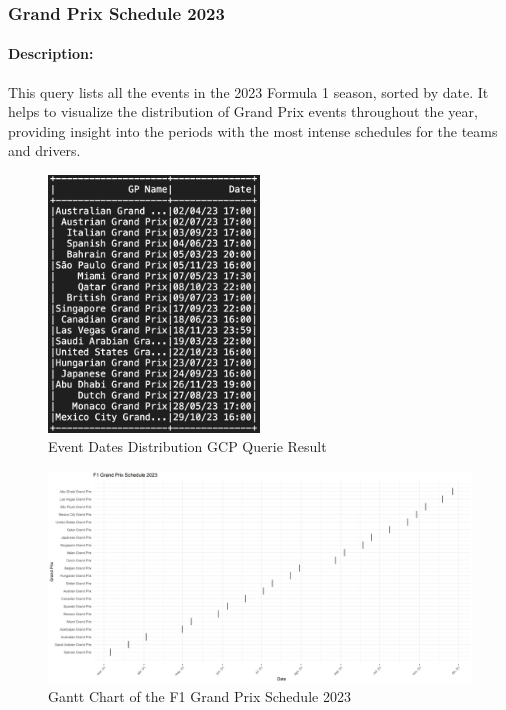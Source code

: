 \documentclass{article}
\begin{document}
\subsubsection{Grand Prix Schedule 2023}
\paragraph{Description:}
This query lists all the events in the 2023 Formula 1 season, sorted by date. It helps to visualize the distribution of Grand Prix events throughout the year, providing insight into the periods with the most intense schedules for the teams and drivers.

\begin{figure}[H]
    \centering
    \includegraphics[width=0.5\textwidth]{ss-event-date.png}
    \caption{Event Dates Distribution GCP Querie Result}
\end{figure}

\begin{figure}[H]
    \centering
    \includegraphics[width=\textwidth]{schedule_gantt.png}
    \caption{Gantt Chart of the F1 Grand Prix Schedule 2023}
\end{figure}
\end{document}
